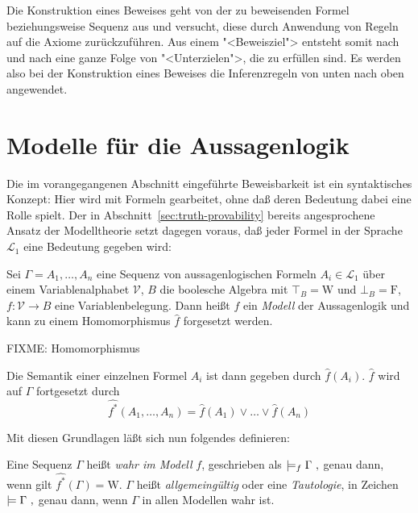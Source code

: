 Die Konstruktion eines Beweises geht
von der zu beweisenden Formel beziehungsweise Sequenz aus und
versucht, diese durch Anwendung von Regeln auf die Axiome zurückzuführen.  Aus
einem "<Beweisziel"> entsteht somit nach und nach eine ganze Folge von
"<Unterzielen">, die zu erfüllen sind.  Es werden also bei der Konstruktion eines
Beweises die Inferenzregeln von unten nach
oben angewendet.

\section{Modelle für die Aussagenlogik}
\label{sec:models}

Die im vorangegangenen Abschnitt eingeführte Beweisbarkeit ist ein
syntaktisches Konzept: Hier wird mit Formeln gearbeitet, ohne daß deren
Bedeutung dabei eine Rolle spielt.  Der in
Abschnitt~\ref{sec:truth-provability} bereits angesprochene Ansatz der
Modelltheorie setzt dagegen voraus, daß jeder
Formel in der Sprache $\mathcal{L}_1$ eine Bedeutung gegeben wird:  

\begin{definition}
  Sei $\Gamma=A_1,\ldots,A_n$ eine Sequenz von aussagenlogischen Formeln $A_i\in
  \mathcal{L}_1$ über einem Variablenalphabet
  $\mathcal{V}$, $B$ die boolesche Algebra mit $\top_B=\mathrm{W}$ und $\bot_B=\mathrm{F}$, $f:\mathcal{V}\rightarrow 
  B$ eine Variablenbelegung.  Dann heißt $f$ ein \emph{Modell} der
  Aussagenlogik und kann zu einem
  Homomorphismus $\hat{f}$ forgesetzt werden.

  FIXME: Homomorphismus

  Die Semantik einer einzelnen Formel $A_i$ ist dann gegeben
  durch $\hat{f}(A_i)$.  $\hat{f}$ wird auf $\Gamma$
  fortgesetzt durch
  \[ \widehat{\mbox{$f$}^*}(A_1,\dots,A_n) = \hat{f}(A_1)\vee\dots\vee\hat{f}(A_n)\]
\end{definition}

Mit diesen Grundlagen läßt sich nun folgendes definieren:

\begin{definition}
  Eine Sequenz $\Gamma$ heißt \emph{wahr im Modell} $f$, geschrieben
  als
%
\(
  \models_f \Gamma\ ,\index{*@$\models_f$}
\)
genau dann, wenn gilt
\(\widehat{\mbox{$f$}^*}(\Gamma) = \mathrm{W}\).
%
$\Gamma$ heißt \emph{allgemeingültig} oder eine \emph{Tautologie}, in Zeichen
%
\(
  \models \Gamma\ ,\index{*@$\models$}
\)
%
genau dann, wenn $\Gamma$ in allen Modellen wahr ist.

\end{definition}


